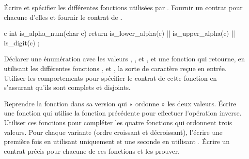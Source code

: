 

\label{l4:contract-modularity-ex-alpha-num}


Écrire et spécifier les différentes fonctions utilisées par
. Fournir un contrat pour chacune d'elles et
fournir le contrat de .


\begin{CodeBlock}{c}
int is_alpha_num(char c){
  return
    is_lower_alpha(c) ||
    is_upper_alpha(c) ||
    is_digit(c) ;
}
\end{CodeBlock}

Déclarer une énumération avec les valeurs , ,
 et , et une fonction 
qui retourne, en utilisant les différentes fonctions ,
 et , la sorte de caractère reçue
en entrée. Utiliser les comportements pour spécifier le contrat de cette fonction
en s'assurant qu'ils sont complets et disjoints.





Reprendre la fonction  dans sa version qui « ordonne »
les deux valeurs. Écrire une fonction  qui utilise la
fonction précédente pour effectuer l'opération inverse. Utiliser ces fonctions
pour compléter les quatre fonctions qui ordonnent trois valeurs. Pour chaque
variante (ordre croissant et décroissant), l'écrire une première fois en
utilisant uniquement  et une seconde en utilisant
. Écrire un contrat précis pour chacune de ces fonctions
et les prouver.


